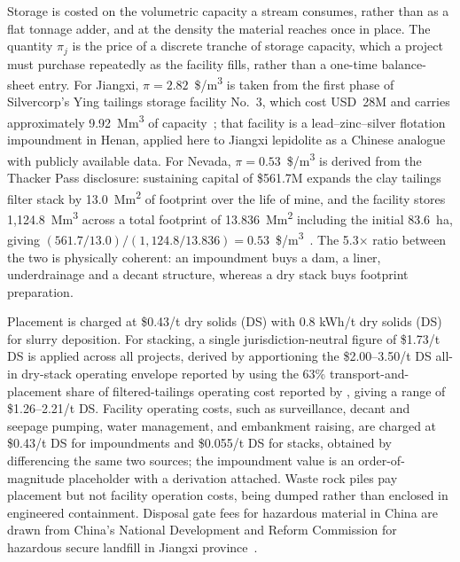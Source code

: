 \documentclass{article}
\renewcommand\_{\textunderscore\allowbreak}
\begin{document}
Storage is costed on the volumetric capacity a stream consumes, rather than as a flat tonnage adder, and at the density the material reaches once in place. The quantity $\pi_j$ is the price of a discrete tranche of storage capacity, which a project must purchase repeatedly as the facility fills, rather than a one-time balance-sheet entry. For Jiangxi, $\pi = 2.82$~\$/\si{m^3} is taken from the first phase of Silvercorp's Ying tailings storage facility No.~3, which cost USD~28M and carries approximately 9.92~\si{Mm^3} of capacity~\cite{silvercorpmetalsinc.TailingsStorageFacility2025}; that facility is a lead--zinc--silver flotation impoundment in Henan, applied here to Jiangxi lepidolite as a Chinese analogue with publicly available data. For Nevada, $\pi = 0.53$~\$/\si{m^3} is derived from the Thacker Pass disclosure: sustaining capital of \$561.7M expands the clay tailings filter stack by 13.0~\si{Mm^2} of footprint over the life of mine, and the facility stores 1,124.8~\si{Mm^3} across a total footprint of 13.836~\si{Mm^2} including the initial 83.6~ha, giving $(561.7/13.0)/(1,124.8/13.836) = 0.53$~\$/\si{m^3}~\cite{sgscanadaincSK1300Technical2024}. The 5.3$\times$ ratio between the two is physically coherent: an impoundment buys a dam, a liner, underdrainage and a decant structure, whereas a dry stack buys footprint preparation.

Placement is charged at \$0.43/t dry solids (DS) with 0.8 kWh/t dry solids (DS) for slurry deposition. For stacking, a single jurisdiction-neutral figure of \$1.73/t DS is applied across all projects, derived by apportioning the \$2.00--3.50/t DS all-in dry-stack operating envelope reported by \citet{crystalFilterPressedDryStacking2018} using the 63\% transport-and-placement share of filtered-tailings operating cost reported by \citet{carneiroConceptualCostComparison2018}, giving a range of \$1.26--2.21/t DS. Facility operating costs, such as surveillance, decant and seepage pumping, water management, and embankment raising, are charged at \$0.43/t DS for impoundments and \$0.055/t DS for stacks, obtained by differencing the same two sources; the impoundment value is an order-of-magnitude placeholder with a derivation attached. Waste rock piles pay placement but not facility operation costs, being dumped rather than enclosed in engineered containment. Disposal gate fees for hazardous material in China are drawn from China's National Development and Reform Commission for hazardous secure landfill in Jiangxi province~\cite{nationaldevelopmentandreformcommission2024}.
\end{document}

